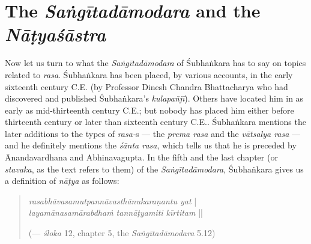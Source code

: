 \section*{The \textsl{Saṅgītadāmodara} and the \textsl{Nāṭyaśāstra}}

Now let us turn to what the \textsl{Saṅgītadāmodara} of Śubhaṅkara has to say on topics related to \textsl{rasa}. Śubhaṅkara has been placed, by various accounts, in the early sixteenth century C.E. (by Professor Dinesh Chandra Bhattacharya who had discovered and published Śubhaṅkara’s \textsl{kulapañjī}). Others have located him in as early as mid-thirteenth century C.E.; but nobody has placed him either before thirteenth century or later than sixteenth century C.E.. Śubhaṅkara mentions the later additions to the types of \textsl{rasa-}s --- the \textsl{prema rasa} and the \textsl{vātsalya rasa} --- and he definitely mentions the \textsl{śānta rasa}, which tells us that he is preceded by Ānandavardhana and Abhinavagupta. In the fifth and the last chapter (or \textsl{stavaka}, as the text refers to them) of the \textsl{Saṅgītadāmodara}, Śubhaṅkara gives us a definition of \textsl{nāṭya} as follows:
\begin{quote}
\textsl{rasabhāvasamutpannāvasthānukaraṇantu yat} |\\
\textsl{layamānasamārabdhaṁ tannāṭyamiti kīrtitam} || 

\hfill (--- \textsl{śloka} 12, chapter 5, the \textsl{Saṅgītadāmodara} 5.12) 
\end{quote}

